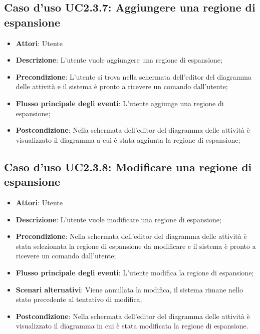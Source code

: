 \documentclass[../AnalisiDeiRequisiti.tex]{subfiles}
\begin{document}
					\subsection{Caso d'uso UC2.3.7: Aggiungere una regione di espansione}
					\begin{itemize}
						\item \textbf{Attori}: Utente
						\item \textbf{Descrizione}: L'utente vuole aggiungere una regione di espansione;
						\item \textbf{Precondizione}: L'utente si trova nella schermata dell'editor del diagramma delle attività e il sistema è pronto a ricevere un comando dall'utente;
						\item \textbf{Flusso principale degli eventi}: L'utente aggiunge una regione di espansione;
						\item \textbf{Postcondizione}: Nella schermata dell'editor del diagramma delle attività è visualizzato il diagramma a cui è stata aggiunta la regione di espansione;
					\end{itemize}
					\subsection{Caso d'uso UC2.3.8: Modificare una regione di espansione}
					\begin{itemize}
						\item \textbf{Attori}: Utente
						\item \textbf{Descrizione}: L'utente vuole modificare una regione di espansione;
						\item \textbf{Precondizione}: Nella schermata dell'editor del diagramma delle attività è stata selezionata la regione di espansione da modificare e il sistema è pronto a ricevere un comando dall'utente;
						\item \textbf{Flusso principale degli eventi}: L'utente modifica la regione di espansione;
						\item \textbf{Scenari alternativi}: Viene annullata la modifica, il sistema rimane nello stato precedente al tentativo di modifica;
						\item \textbf{Postcondizione}: Nella schermata dell'editor del diagramma delle attività è visualizzato il diagramma in cui è stata modificata la regione di espansione.
					\end{itemize}
\end{document}
